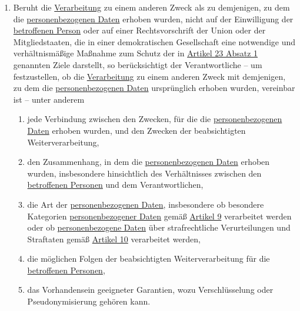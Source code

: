 \begin{enumerate}
  \item Beruht die \hyperref[itm:04-2]{Verarbeitung} zu einem anderen Zweck als zu demjenigen, zu dem die \hyperref[itm:04-1]{personenbezogenen Daten} erhoben
   wurden, nicht auf der Einwilligung der \hyperref[itm:04-1]{betroffenen Person} oder auf einer Rechtsvorschrift der Union oder der
   Mitgliedstaaten, die in einer demokratischen Gesellschaft eine notwendige und verhältnismäßige Maßnahme zum Schutz
   der in \hyperref[itm:23-1]{Artikel 23 Absatz 1} genannten Ziele darstellt, so berücksichtigt der Verantwortliche --
   um festzustellen, ob die \hyperref[itm:04-2]{Verarbeitung} zu einem anderen Zweck mit demjenigen, zu dem die \hyperref[itm:04-1]{personenbezogenen Daten}
   ursprünglich erhoben wurden, vereinbar ist -- unter anderem
  \label{itm:06-4}

  \begin{enumerate}
  
    \item jede Verbindung zwischen den Zwecken, für die die \hyperref[itm:04-1]{personenbezogenen Daten} erhoben wurden, und den Zwecken der
     beabsichtigten Weiterverarbeitung,
    \label{itm:06-4a}

    \item den Zusammenhang, in dem die \hyperref[itm:04-1]{personenbezogenen Daten} erhoben wurden, insbesondere hinsichtlich des
     Verhältnisses zwischen den \hyperref[itm:04-1]{betroffenen Personen} und dem Verantwortlichen,
    \label{itm:06-4b}

    \item die Art der \hyperref[itm:04-1]{personenbezogenen Daten}, insbesondere ob besondere Kategorien \hyperref[itm:04-1]{personenbezogener Daten} gemäß
     \hyperref[ch:9]{Artikel 9} verarbeitet werden oder ob \hyperref[itm:04-1]{personenbezogene Daten} über strafrechtliche Verurteilungen
      und Straftaten gemäß \hyperref[ch:10]{Artikel 10} verarbeitet werden,
    \label{itm:06-4c}

    \item die möglichen Folgen der beabsichtigten Weiterverarbeitung für die \hyperref[itm:04-1]{betroffenen Personen},
    \label{itm:06-4d}

    \item das Vorhandensein geeigneter Garantien, wozu Verschlüsselung oder Pseudonymisierung gehören kann.
    \label{itm:06-4e}

  \end{enumerate}

\end{enumerate}


